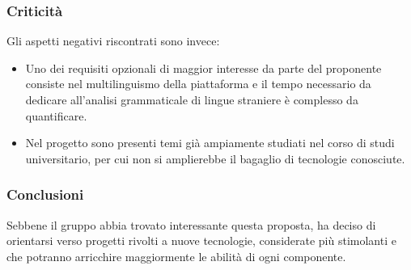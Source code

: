 \subsubsection{Criticità}
Gli aspetti negativi riscontrati sono invece:
\begin{itemize}
	\item Uno dei requisiti opzionali di maggior interesse da parte del
	 proponente consiste nel multilinguismo della piattaforma e il tempo
	 necessario da dedicare all'analisi grammaticale di lingue straniere è
	 complesso da quantificare.
	
	\item Nel progetto sono presenti temi già ampiamente studiati nel corso di
	 studi universitario, per cui non si amplierebbe il bagaglio di
	 tecnologie conosciute.
 	
\end{itemize}
\subsubsection{Conclusioni}
Sebbene il gruppo abbia trovato interessante questa proposta, ha deciso
di orientarsi verso progetti rivolti a nuove tecnologie, considerate più
stimolanti e che potranno arricchire maggiormente le abilità di ogni 
componente. 



